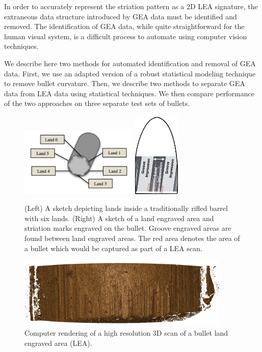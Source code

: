 \documentclass[12pt]{article}
\begin{document}
In order to accurately represent the striation pattern as a 2D LEA
signature, the extraneous data structure introduced by GEA data must be
identified and removed. The identification of GEA data, while quite
straightforward for the human visual system, is a difficult process to
automate using computer vision techniques.

We describe here two methods for automated identification and removal of
GEA data. First, we use an adapted version of a robust statistical
modeling technique to remove bullet curvature. Then, we describe two
methods to separate GEA data from LEA data using statistical techniques.
We then compare performance of the two approaches on three separate test
sets of bullets.

\begin{figure}

\includegraphics[width=0.5\textwidth]{../images/scanning-stage0}
\hspace{3cm}
\includegraphics[width=0.2\textwidth]{../images/bullet-sketch}
\caption{(Left) A sketch depicting lands inside a traditionally rifled barrel with six lands. (Right) A sketch of a land engraved area and striation marks engraved on the bullet. Groove engraved areas are found between land engraved areas. The red area denotes the area of a bullet which would be captured as part of a LEA scan.}
\label{barrel-bullet}
\end{figure}

\begin{figure}
\centering
\includegraphics[width=0.9\textwidth]{../images/scan_example}
\caption{Computer rendering of a high resolution 3D scan of a bullet land engraved area (LEA).}
\label{scan-example}
\end{figure}
\end{document}
